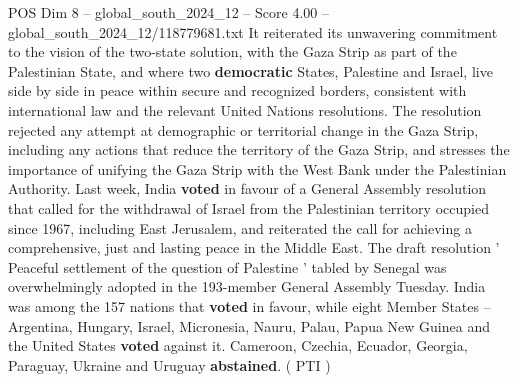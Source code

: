 \begin{textsample}{POS Dim 8 – global\_south\_2024\_12 – Score 4.00 – global\_south\_2024\_12/118779681.txt}
It reiterated its unwavering commitment to the vision of the two-state solution, with the Gaza Strip as part of the Palestinian State, and where two \textbf{democratic} States, Palestine and Israel, live side by side in peace within secure and recognized borders, consistent with international law and the relevant United Nations resolutions.
The resolution rejected any attempt at demographic or territorial change in the Gaza Strip, including any actions that reduce the territory of the Gaza Strip, and stresses the importance of unifying the Gaza Strip with the West Bank under the Palestinian Authority.
Last week, India \textbf{voted} in favour of a General Assembly resolution that called for the withdrawal of Israel from the Palestinian territory occupied since 1967, including East Jerusalem, and reiterated the call for achieving a comprehensive, just and lasting peace in the Middle East.
The draft resolution ' Peaceful settlement of the question of Palestine ' tabled by Senegal was overwhelmingly adopted in the 193-member General Assembly Tuesday.
India was among the 157 nations that \textbf{voted} in favour, while eight Member States -- Argentina, Hungary, Israel, Micronesia, Nauru, Palau, Papua New Guinea and the United States \textbf{voted} against it.
Cameroon, Czechia, Ecuador, Georgia, Paraguay, Ukraine and Uruguay \textbf{abstained}. ( PTI )

\end{textsample}
